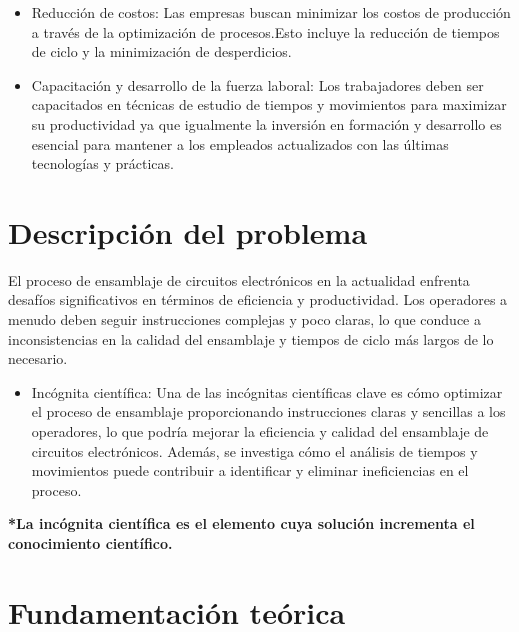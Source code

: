     \begin{itemize}
    
    \item Reducción de costos:
        Las empresas buscan minimizar los costos de producción a través de la optimización de procesos.Esto incluye la reducción de tiempos de ciclo y la minimización de desperdicios.
    
    \item Capacitación y desarrollo de la fuerza laboral:
        Los trabajadores deben ser capacitados en técnicas de estudio de tiempos y movimientos para maximizar su productividad ya que igualmente la inversión en formación y desarrollo es esencial para mantener a los empleados actualizados con las últimas tecnologías y prácticas.
    
        
        
    \end{itemize}
    \section{Descripción del problema}
    
    El proceso de ensamblaje de circuitos electrónicos en la actualidad enfrenta desafíos significativos en términos de eficiencia y productividad. Los operadores a menudo deben seguir instrucciones complejas y poco claras, lo que conduce a inconsistencias en la calidad del ensamblaje y tiempos de ciclo más largos de lo necesario. 
    
    \begin{itemize}
        \item Incógnita científica:
    Una de las incógnitas científicas clave es cómo optimizar el proceso de ensamblaje proporcionando instrucciones claras y sencillas a los operadores, lo que podría mejorar la eficiencia y calidad del ensamblaje de circuitos electrónicos. Además, se investiga cómo el análisis de tiempos y movimientos puede contribuir a identificar y eliminar ineficiencias en el proceso.
    
       
    \end{itemize}
    
    \textbf{*La incógnita científica es el elemento cuya solución incrementa el conocimiento científico.}
    \section{Fundamentación teórica}
    
